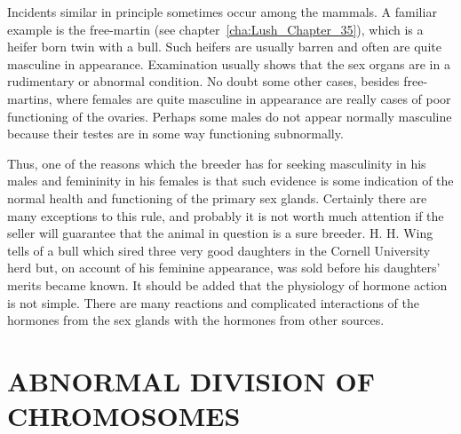 Incidents similar in principle sometimes occur among the mammals.
A familiar example is the free-martin (see chapter~\ref{cha:Lush_Chapter_35}),
which is a heifer born twin with a bull. Such heifers are usually barren
and often are quite masculine in appearance. Examination usually shows
that the sex organs are in a rudimentary or abnormal condition. No doubt
some other cases, besides free-martins, where females are quite masculine
in appearance are really cases of poor functioning of the ovaries. Perhaps
some males do not appear normally masculine because their testes are
in some way functioning subnormally.

Thus, one of the reasons which the breeder has for seeking masculinity
in his males and femininity in his females is that such evidence is
some indication of the normal health and functioning of the primary
sex glands. Certainly there are many exceptions to this rule, and probably
it is not worth much attention if the seller will guarantee that the
animal in question is a sure breeder. H. H. Wing tells of a bull which
sired three very good daughters in the Cornell University herd but, on
account of his feminine appearance, was sold before his daughters'
merits became known. It should be added that the physiology of hormone
action is not simple. There are many reactions and complicated
interactions of the hormones from the sex glands with the hormones
from other sources.

\section*{ABNORMAL DIVISION OF CHROMOSOMES}

